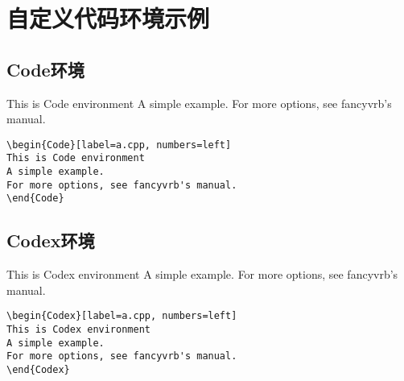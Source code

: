\section{自定义代码环境示例}
\label{codex}
\subsection{Code环境}
\begin{minipage}{\textwidth}
\begin{minipage}{0.4\textwidth}
\begin{Code}[label=a.cpp, numbers=left]
This is Code environment
A simple example.
For more options, see fancyvrb's manual.
\end{Code}
\end{minipage}
\hfill\begin{minipage}{0.4\textwidth}
\begin{Verbatim}[fontsize=\scriptsize,baselinestretch=0.9,xleftmargin=3mm,frame=lines,labelposition=all,framesep=5pt]
\begin{Code}[label=a.cpp, numbers=left]
This is Code environment
A simple example.
For more options, see fancyvrb's manual.
\end{Code}
\end{Verbatim}
\end{minipage}
\end{minipage}

\subsection{Codex环境}
\begin{minipage}{\textwidth}
\begin{minipage}{0.4\textwidth}
\begin{Codex}[label=a.cpp, numbers=left]
This is Codex environment
A simple example.
For more options, see fancyvrb's manual.
\end{Codex}
\end{minipage}
\hfill\begin{minipage}{0.4\textwidth}
\begin{Verbatim}[fontsize=\scriptsize,baselinestretch=0.9,xleftmargin=3mm,frame=lines,labelposition=all,framesep=5pt]
\begin{Codex}[label=a.cpp, numbers=left]
This is Codex environment
A simple example.
For more options, see fancyvrb's manual.
\end{Codex}
\end{Verbatim}
\end{minipage}
\end{minipage}

